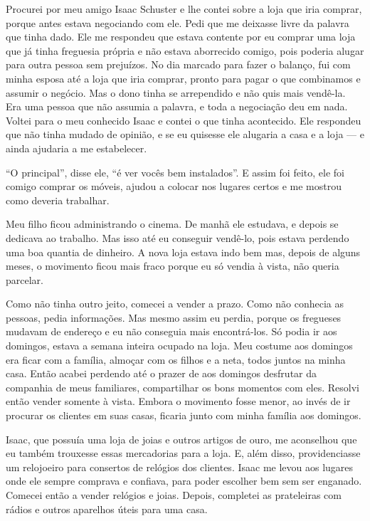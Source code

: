 Procurei por meu amigo Isaac Schuster e lhe contei sobre a loja que
iria comprar, porque antes estava negociando com ele. Pedi que
me deixasse livre da palavra que tinha dado. Ele me respondeu que
estava contente por eu comprar uma loja que já tinha freguesia própria e não estava aborrecido comigo, pois poderia alugar para
outra pessoa sem prejuízos. No dia marcado para fazer o
balanço, fui com minha esposa até a loja que iria comprar, pronto
para pagar o que combinamos e assumir o negócio. Mas o dono
tinha se arrependido e não quis mais vendê-la. Era uma pessoa que
não assumia a palavra, e toda a negociação deu em nada. Voltei para o
meu conhecido Isaac e contei o que tinha acontecido. Ele respondeu que não tinha mudado de opinião, e se
eu quisesse ele alugaria a casa e a loja --- e ainda ajudaria a me
estabelecer.

``O principal'', disse ele, ``é ver vocês bem instalados''. E assim foi
feito, ele foi comigo comprar os móveis, ajudou a colocar nos lugares
certos e me mostrou como deveria trabalhar.

Meu filho ficou administrando o cinema. De manhã ele estudava, e depois
se dedicava ao trabalho. Mas isso até eu conseguir
vendê-lo, pois estava perdendo uma boa quantia de dinheiro. A nova loja estava indo
bem mas, depois de alguns meses, o movimento ficou mais fraco porque eu
só vendia à vista, não queria parcelar. 

Como não tinha outro jeito, comecei a vender a prazo. Como não conhecia as pessoas, pedia
informações. Mas mesmo assim eu perdia, porque os fregueses mudavam de
endereço e eu não conseguia mais encontrá-los. Só podia ir aos domingos, estava a semana inteira ocupado na loja. Meu costume aos
domingos era ficar com a família, almoçar com os filhos e a neta, todos
juntos na minha casa. Então acabei perdendo até o prazer de aos domingos desfrutar da companhia de meus familiares,
compartilhar os bons momentos com eles. Resolvi então vender somente à
vista. Embora o movimento fosse menor, ao invés de ir procurar os clientes
em suas casas, ficaria junto com minha família aos domingos.

Isaac, que possuía uma loja de joias e
outros artigos de ouro, me aconselhou que eu também trouxesse essas mercadorias para a 
loja. E, além disso, providenciasse um relojoeiro para
consertos de relógios dos clientes. Isaac
me levou aos lugares onde ele sempre comprava e confiava, para poder escolher
bem sem ser enganado. Comecei então a vender relógios e joias. Depois, completei as prateleiras com rádios e outros aparelhos úteis para uma casa.

